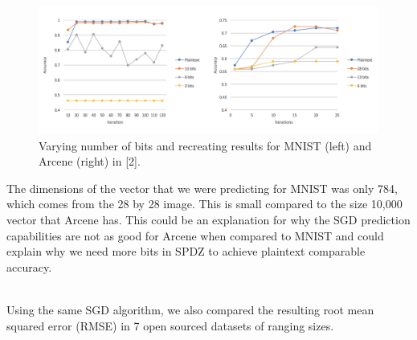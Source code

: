 \documentclass{article}
\theoremstyle{plain}
\theoremstyle{definition}
\theoremstyle{remark}
\begin{document}
\begin{figure}[H]
\centering
  \includegraphics[scale=0.6]{mnistarcene.png}
  \caption{Varying number of bits and recreating results for MNIST (left) and Arcene (right) in [2].}
  \label{fig:result4}
\end{figure}

\noindent
The dimensions of the vector that we were predicting for MNIST was only 784, which comes from the 28 by 28 image. This is small compared to the size 10,000 vector that Arcene has. This could be an explanation for why the SGD prediction capabilities are not as good for Arcene when compared to MNIST and could explain why we need more bits in SPDZ to achieve plaintext comparable accuracy. 

\noindent
\\Using the same SGD algorithm, we also compared the resulting root mean squared error (RMSE) in 7 open sourced datasets of ranging sizes.
\end{document}
